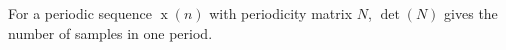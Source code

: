 For a periodic sequence $\operatorname{x}(n)$ with periodicity matrix $N$, $\det(N)$ gives the number of samples in one period.
